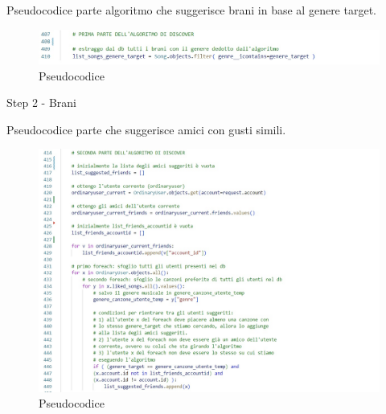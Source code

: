 Pseudocodice parte algoritmo che suggerisce brani in base al genere target.
\begin{figure}[H]
    \centering
    \includegraphics[scale=0.7]{images/alg2.jpg}
    \caption{Pseudocodice}
    \label{fig-pseudocodice-2}
\end{figure}
\vspace{1.5cm}

\begin{algorithm}[H]
    \caption{Step 2 - Brani}
    \SetAlgoLined
   
\end{algorithm}





\newpage
Pseudocodice parte che suggerisce amici con gusti simili. 
\begin{figure}[H]
    \centering
    \includegraphics[scale=0.7]{images/alg3.jpg}
    \caption{Pseudocodice}
    \label{fig-pseudocodice-3}
\end{figure}


